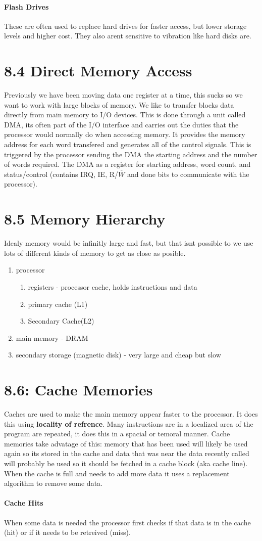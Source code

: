 \documentclass[12pt]{article}
\begin{document}
\paragraph*{Flash Drives}
These are often used to replace hard drives for faster access, but lower storage levels and higher cost. They also arent sensitive to vibration like hard disks are.
\section{8.4 Direct Memory Access}
Previously we have been moving data one register at a time, this sucks so we want to work with large blocks of memory. We like to transfer blocks data directly from main memory to I/O devices. This is done through a unit called DMA, its often part of the I/O interface and carries out the duties that the processor would normally do when accessing memory. It provides the memory address for each word transfered and generates all of the control signals. This is triggered by the processor sending the DMA the starting address and the number of words required. The DMA as a register for starting address, word count, and status/control (contains IRQ, IE, R/$\overline{W}$ and done bits to communicate with the processor).
\section*{8.5 Memory Hierarchy}
Idealy memory would be infinitly large and fast, but that isnt possible to we use lots of different kinds of memory to get as close as posible. 
\begin{enumerate}
\item processor
	\begin{enumerate}
	\item registers - processor cache, holds instructions and data 
	\item primary cache (L1) 
	\item Secondary Cache(L2)
	\end{enumerate}
\item main memory - DRAM
\item secondary storage (magnetic disk) - very large and cheap but slow
\end{enumerate}
\section*{8.6: Cache Memories}
Caches are used to make the main memory appear faster to the processor. It does this using \textbf{locality of refrence}. Many instructions are in a localized area of the program are repeated, it does this in a spacial or temoral manner. Cache memories take advatage of this: memory that has been used will likely be used again so its stored in the cache and data that was near the data recently called will probably be used so it should be fetched in a cache block (aka cache line). When the cache is full and needs to add more data it uses a replacement algorithm to remove some data.
\paragraph*{Cache Hits}
When some data is needed the processor first checks if that data is in the cache (hit) or if it needs to be retreived (miss). 
\end{document}
